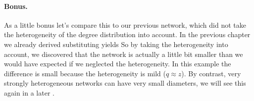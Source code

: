 \paragraph{Bonus.}As a little bonus let's compare this to our previous network, which did not take the heterogeneity of the degree distribution into account. In the previous chapter we already derived 
substituting yields 
So by taking the heterogeneity into account, we discovered that the network is actually a little bit smaller than we would have expected if we neglected the heterogeneity. In this example the difference is small because the heterogeneity is mild ($q\approx z$). By contrast, very strongly heterogeneous networks can have very small diameters, we will see this again in a later . 
